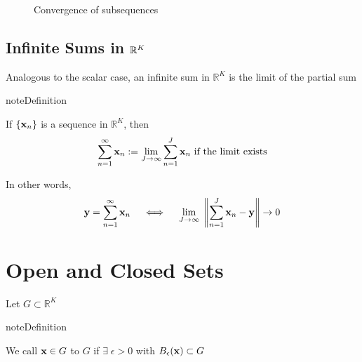 \documentclass[letterpaper,10pt,english]{jupyterBook}
\begin{document}
\begin{figure}[htbp]
\centering
\capstart

\noindent{}
\caption{Convergence of subsequences}\label{\detokenize{04.basic_analysis:subseqconverg}}\end{figure}


\subsection{Infinite Sums in \protect\(\mathbb{R}^K\protect\)}
\label{\detokenize{04.basic_analysis:infinite-sums-in-mathbb-r-k}}
\sphinxAtStartPar
Analogous to the scalar case, an infinite sum in \(\mathbb{R}^K\) is the limit of the partial sum

\begin{sphinxadmonition}{note}{Definition}

\sphinxAtStartPar
If \(\{{\bf x}_n\}\) is a sequence in \(\mathbb{R}^K\), then
\begin{equation*}
\begin{split}
\sum_{n=1}^{\infty} {\bf x}_n := \lim_{J\to \infty} \sum_{n=1}^J {\bf x}_n  
\text{ if the limit exists}
\end{split}
\end{equation*}\end{sphinxadmonition}

\sphinxAtStartPar
In other words,
\begin{equation*}
\begin{split}
{\bf y} = \sum_{n=1}^{\infty} {\bf x}_n 
\quad \iff \quad
\lim_{J \to \infty}
\;
\left\| \sum_{n=1}^J {\bf x}_n  - {\bf y} \right\|
\to 0
\end{split}
\end{equation*}

\section{Open and Closed Sets}
\label{\detokenize{04.basic_analysis:open-and-closed-sets}}
\sphinxAtStartPar
Let \(G \subset \mathbb{R}^K\)

\begin{sphinxadmonition}{note}{Definition}

\sphinxAtStartPar
We call \({\bf x} \in G\)  to \(G\) if
\(\exists \; \epsilon > 0\) with \(B_\epsilon({\bf x}) \subset G\)
\end{sphinxadmonition}
\end{document}
